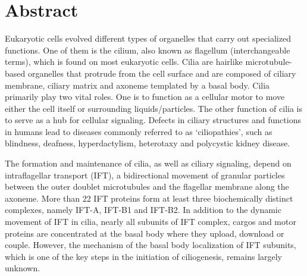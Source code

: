 \chapter{Abstract}
\renewcommand{\leftmark}{Abstract}
Eukaryotic cells evolved different types of organelles that carry out specialized functions. One of them is the cilium, also known as flagellum (interchangeable terms), which is found on most eukaryotic cells. Cilia are hairlike microtubule-based organelles that protrude from the cell surface and are composed of ciliary membrane, ciliary matrix and axoneme templated by a basal body. Cilia primarily play two vital roles. One is to function as a cellular motor to move either the cell itself or surrounding liquids/particles. The other function of cilia is to serve as a hub for cellular signaling. Defects in ciliary structures and functions in humans lead to diseases commonly referred to as `ciliopathies', such as blindness, deafness, hyperdactylism, heterotaxy and polycystic kidney disease.

The formation and maintenance of cilia, as well as ciliary signaling, depend on intraflagellar transport (IFT), a bidirectional movement of granular particles between the outer doublet microtubules and the flagellar membrane along the axoneme. More than 22 IFT proteins form at least three biochemically distinct complexes, namely IFT-A, IFT-B1 and IFT-B2. In addition to the dynamic movement of IFT in cilia, nearly all subunits of IFT complex, cargos and motor proteins are concentrated at the basal body where they upload, download or couple. However, the mechanism of the basal body localization of IFT subunits, which is one of the key steps in the initiation of ciliogenesis, remains largely unknown.

